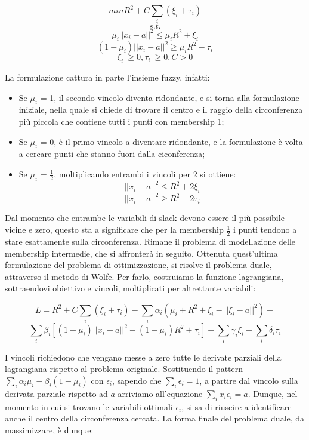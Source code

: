 \documentclass[12pt,a4paper]{report}
\begin{document}
\[ min R^2 + C\sum_{i} (\xi_{i} + \tau_{i})\]
\[s.t.\]
\[ \mu_i||x_i - a||^2  \leq \mu_i R^2 + \xi_{i}\]
\[ (1 - \mu_i)||x_i - a||^2  \geq \mu_i R^2 - \tau_{i}\]
\[ \xi_{i}\ \geq 0, \tau_{i}\ \geq 0 ,  C > 0\]

La formulazione cattura in parte l'insieme fuzzy, infatti:
\begin{itemize}
  \item Se  $\mu_i$ = 1, il secondo vincolo diventa ridondante, e si torna alla formulazione iniziale, nella quale si chiede di trovare il centro  e il raggio della circonferenza più piccola che contiene tutti i punti con membership 1;
  \item Se   $\mu_i$ = 0, è il primo vincolo a diventare ridondante, e la formulazione è volta a cercare punti che stanno fuori dalla ciconferenza;
  \item Se   $\mu_i$ = $\frac{1}{2}$, moltiplicando entrambi i vincoli per 2 si ottiene:
\[ ||x_i - a||^2  \leq R^2 + 2\xi_{i}\]
\[ ||x_i - a||^2  \geq R^2 - 2\tau_{i}\]
\end{itemize}

Dal momento che entrambe le variabili di slack devono essere il più possibile vicine e zero, questo sta a significare che per la membership  $\frac{1}{2}$ i punti tendono a stare esattamente sulla circonferenza. Rimane il problema di modellazione delle membership intermedie, che si affronterà in seguito.
Ottenuta quest'ultima formulazione del problema di ottimizzazione, si risolve il problema duale, attraverso il metodo di Wolfe. Per farlo, costruiamo la funzione lagrangiana, sottraendovi obiettivo e vincoli, moltiplicati per altrettante variabili:

\[ L = R^2 + C\sum_{i}(\xi_i + \tau_i) - \sum_{i}\alpha_i(\mu_i+R^2 + \xi_i - ||\xi_i - a||^2) -\] 
\[\sum_{i}\beta_i[(1- \mu_i)||x_i - a||^2 - (1 - \mu_i)R^2 + \tau_i] -  \sum_{i}\gamma_i\xi_i - \sum_{i}\delta_i\tau_i\]

I vincoli richiedono che vengano messe a zero tutte le derivate parziali della lagrangiana rispetto al problema originale. Sostituendo il pattern $\sum_{i}\alpha_i\mu_i - \beta_i(1-\mu_i)$ con $\epsilon_i$, sapendo che $\sum_{i}\epsilon_i = 1$, a partire dal vincolo sulla derivata parziale rispetto ad $a$ arriviamo all'equazione  $\sum_{i}x_i\epsilon_i = a$. Dunque, nel momento in cui si trovano le variabili ottimali $\epsilon_i$, si sa di riuscire a identificare anche il centro della circonferenza cercata.
La forma finale del problema duale, da massimizzare, è dunque:
\end{document}

